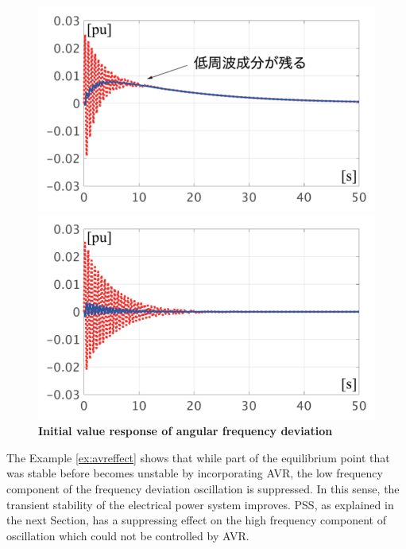 \documentclass[graybox, envcountchap]{svmult}
\begin{document}
\begin{figure}[t]
  \centering
  {
  \begin{minipage}{0.49\linewidth}
    \centering
    \includegraphics[width = 1.0\linewidth]{figs/woAVRlarge}
  \end{minipage}
  \begin{minipage}{0.49\linewidth}
    \centering
    \includegraphics[width = 1.0\linewidth]{figs/wAVRlarge}
  \end{minipage}
  \medskip
  \caption{\textbf{Initial value response of angular frequency deviation}
  \\  
}
  \label{fig:avrlarged}
  }
\medskip
\end{figure}

The Example \ref{ex:avreffect} shows that while part of the equilibrium point that was stable before becomes unstable by incorporating AVR, the low frequency component of the frequency deviation oscillation is suppressed.
In this sense, the transient stability of the electrical power system improves.
PSS, as explained in the next Section, has a suppressing effect on the high frequency component of oscillation which could not be controlled by AVR.
\end{document}
